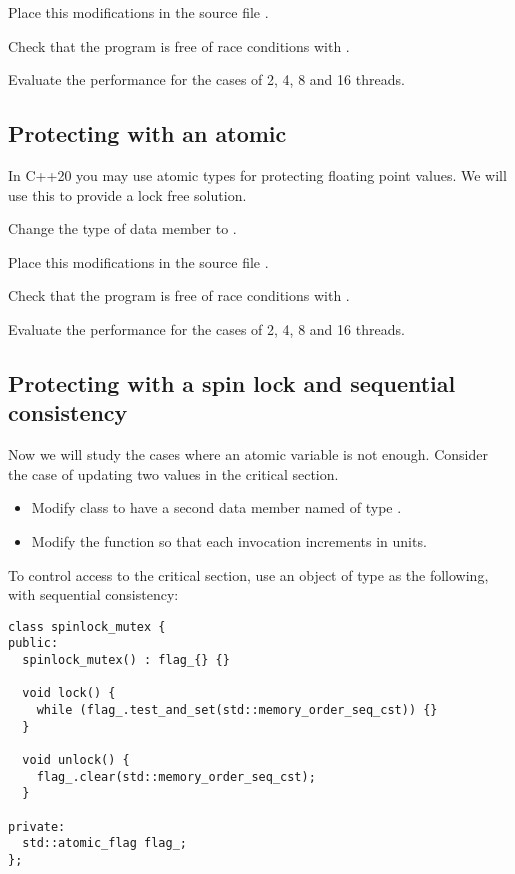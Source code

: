 Place this modifications in the source file .

Check that the program is free of race conditions with .

Evaluate the performance for the cases of 2, 4, 8 and 16 threads.

\subsection{Protecting with an atomic}

In C++20 you may use atomic types for protecting floating point values.
We will use this to provide a lock free solution.

Change the type of data member  to .

Place this modifications in the source file .

Check that the program is free of race conditions with .

Evaluate the performance for the cases of 2, 4, 8 and 16 threads.

\subsection{Protecting with a spin lock and sequential consistency}

Now we will study the cases where an atomic variable is not enough.
Consider the case of updating two values in the critical section.

\begin{itemize}

  \item Modify class  to have a second data member named  
        of type .

  \item Modify the  function so that each invocation increments
         in  units.

\end{itemize}

To control access to the critical section, use an object of type  
as the following, with sequential consistency:
\begin{lstlisting}
class spinlock_mutex {
public:
  spinlock_mutex() : flag_{} {}

  void lock() {
    while (flag_.test_and_set(std::memory_order_seq_cst)) {}
  }

  void unlock() {
    flag_.clear(std::memory_order_seq_cst);
  }

private:
  std::atomic_flag flag_;
};
\end{lstlisting}

